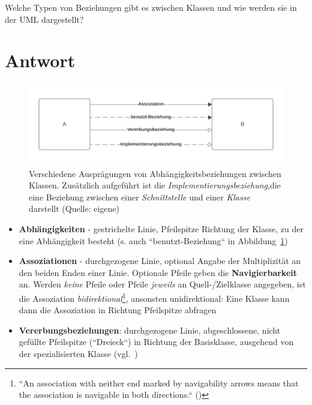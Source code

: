 Welche Typen von Beziehungen gibt es zwischen Klassen und wie werden sie in der UML dargestellt?


\section*{Antwort}

\begin{figure}
    \centering
    \includegraphics[scale=0.4]{chapters/aufgabe 1/img/umldependencies}
    \caption{Verschiedene Ausprägungen von Abhängigkeitsbeziehungen zwischen Klassen.
    Zusätzlich aufgeführt ist die \textit{Implementierungsbeziehung},die eine Beziehung zwischen einer \textit{Schnittstelle} und einer \textit{Klasse} darstellt (Quelle: eigene)}
    \label{fig:umldependencies}
\end{figure}

\begin{itemize}
    \item \textbf{Abhängigkeiten} - gestrichelte Linie, Pfeilspitze Richtung der Klasse, zu der eine Abhängigkeit besteht (s. auch ``benutzt-Beziehung`` in Abbildung~\ref{fig:umldependencies})
    \item \textbf{Assoziationen} - durchgezogene Linie, optional Angabe der Multiplizität an den beiden Enden einer Linie.
    Optionale Pfeile geben die \textbf{Navigierbarkeit} an.
    Werden \textit{keine} Pfeile oder Pfeile \textit{jeweils} an Quell-/Zielklasse angegeben, ist die Assoziation \textit{bidirektional}\footnote{
    ``An association with neither end marked by navigability arrows means that the association is navigable in both
    directions.`` (\cite[18]{UML17})
    }, ansonsten unidirektional: Eine Klasse kann dann die Assoziation in Richtung Pfeilspitze abfragen
    \item \textbf{Vererbungsbeziehungen}: durchgezogene Linie, abgeschlossene, nicht gefüllte Pfeilspitze (``Dreieck``) in Richtung der Basisklasse, ausgehend von der spezialisierten Klasse (vgl.~\cite[52]{Bal05})
\end{itemize}